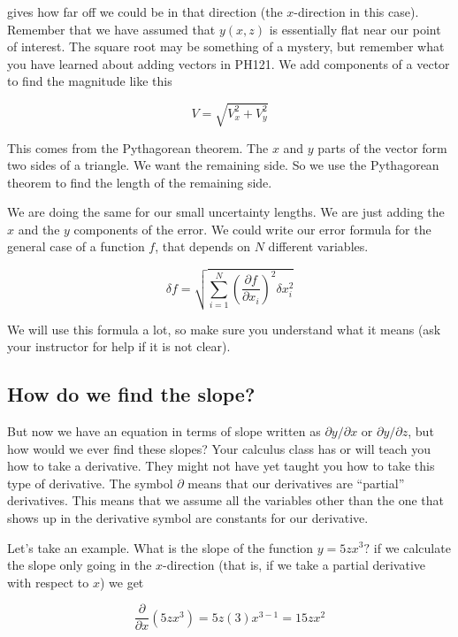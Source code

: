 gives how far off we could be in that direction (the $x$-direction in this case). Remember that we have assumed that $y\left( x,z\right) $ is essentially flat near our point of interest. The square root may be something of a mystery, but remember what you have learned about adding vectors in PH121. We add components of a vector to find the magnitude like this
 
\begin{equation*}
	V=\sqrt{V_{x}^{2}+V_{y}^{2}}
\end{equation*}

This comes from the Pythagorean theorem. The $x$ and $y$ parts of the vector form two sides of a triangle. We want the remaining side. So we use the Pythagorean theorem to find the length of the remaining side.

We are doing the same for our small uncertainty lengths. We are just adding the $x$ and the $y$ components of the error. We could write our error formula for the general case of a function $f$, that depends on $N$ different variables. 

\begin{equation*}
	\delta f=\sqrt{\sum_{i=1}^{N}\left( \frac{\partial f}{\partial x_{i}}\right)^{2}\delta x_{i}^{2}}
\end{equation*}

We will use this formula a lot, so make sure you understand what it means (ask your instructor for help if it is not clear).

\subsection{How do we find the slope?}

But now we have an equation in terms of slope written as $\partial y/\partial x$ or $\partial y/\partial z$, but how would we ever find these slopes? Your calculus class has or will teach you how to take a derivative. They might not have yet taught you how to take this type of derivative. The symbol $\partial $ means that our derivatives are ``partial'' derivatives. This means that we assume all the variables other than the one that shows up in the derivative symbol are constants for our derivative.

Let's take an example. What is the slope of the function $y=5zx^{3}?$ if we calculate the slope only going in the $x$-direction (that is, if we take a partial derivative with respect to $x$) we get

\begin{equation*}
   \frac{\partial }{\partial x}\left( 5zx^{3}\right) =5z\left( 3\right) x^{3-1}=15zx^{2}
\end{equation*}


